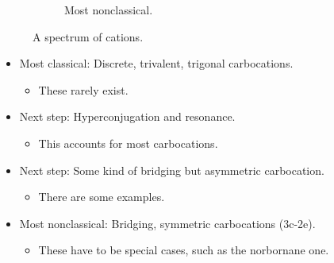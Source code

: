 \documentclass[../notes.tex]{subfiles}
\begin{document}
\begin{itemize}
\begin{figure}[h!]
\begin{subfigure}[b]{0.2\linewidth}
            \centering
            \chemleft{[}
            \chemright{]^\oplus}
            \caption{Most nonclassical.}
            \label{fig:CCspectrumd}
        \end{subfigure}
        \caption{A spectrum of cations.}
        \label{fig:CCspectrum}
    \end{figure}
    \begin{itemize}
        \item Most classical: Discrete, trivalent, trigonal carbocations.
        \begin{itemize}
            \item These rarely exist.
        \end{itemize}
        \item Next step: Hyperconjugation and resonance.
        \begin{itemize}
            \item This accounts for most carbocations.
        \end{itemize}
        \item Next step: Some kind of bridging but asymmetric carbocation.
        \begin{itemize}
            \item There are some examples.
        \end{itemize}
        \item Most nonclassical: Bridging, symmetric carbocations (3c-2e).
        \begin{itemize}
            \item These have to be special cases, such as the norbornane one.
        \end{itemize}
    \end{itemize}
\end{itemize}
\end{document}
